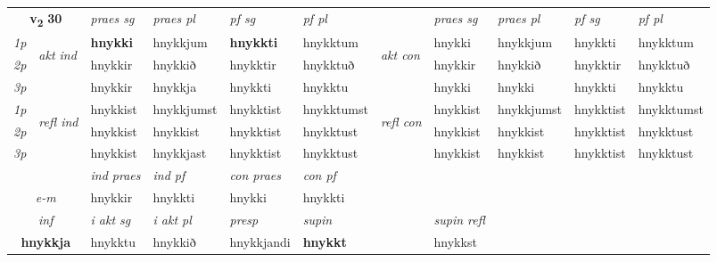 \noindent
\begin{tabular}{lllllllllll} \toprule
\multicolumn{2}{c}{\textbf{v{\textsubscript{2}}} \Large{\textbf{30}}}  &  \textit{praes sg}  & \textit{praes pl}  &\textit{ pf sg} & \textit{pf pl} &  &  \textit{praes sg}  & \textit{praes pl}  & \textit{pf sg} & \textit{pf pl } \\*
	\cmidrule{3-6} \cmidrule{8-11}
 {\textit{1p}} & \multirow{3}{*}{\begin{turn}{90}\textit{akt ind}\end{turn}} & \textbf{hnykki} & hnykkjum & \textbf{hnykkti} & hnykktum & \multirow{3}{*}{\begin{turn}{90}\textit{akt con}\end{turn}} &hnykki & hnykkjum & hnykkti & hnykktum\\*
 {\textit{2p}} &  &  hnykkir  & hnykkið & hnykktir & hnykktuð & & hnykkir & hnykkið & hnykktir & hnykktuð \\*
{\textit{3p}} &  & hnykkir & hnykkja & hnykkti & hnykktu & & hnykki & hnykki& hnykkti & hnykktu \\*
\cmidrule{3-6} \cmidrule{8-11}
 {\textit{1p}} & \multirow{3}{*}{\begin{turn}{90}\textit{refl ind}\end{turn}}  & hnykkist & hnykkjumst & hnykktist & hnykktumst & \multirow{3}{*}{\begin{turn}{90}\textit{refl con}\end{turn}}  &hnykkist & hnykkjumst & hnykktist & hnykktumst \\*
 {\textit{2p}} &  & hnykkist & hnykkist & hnykktist & hnykktust & &hnykkist & hnykkist & hnykktist & hnykktust \\*
 {\textit{3p}}  & & hnykkist & hnykkjast & hnykktist & hnykktust & & hnykkist & hnykkist& hnykktist & hnykktust \\*
\cmidrule{3-6} \cmidrule{8-11}

   & &  \textit{ind praes} & \textit{ind pf} & \textit{con praes} & \textit{con pf} \\*
\multicolumn{2}{c}{ \textit{e-m} } & hnykkir & hnykkti & hnykki & hnykkti \\*

\cmidrule{3-8}
   \multicolumn{2}{c}{\textit{inf}}  & \textit{i akt sg} & \textit{i akt pl}   & \textit{presp} & \textit{supin} && \textit{supin refl}  \\*
  \multicolumn{2}{c}{\textbf{hnykkja}} & hnykktu  & hnykkið   & hnykkjandi &  \textbf{hnykkt} && hnykkst  \\*
\end{tabular}

